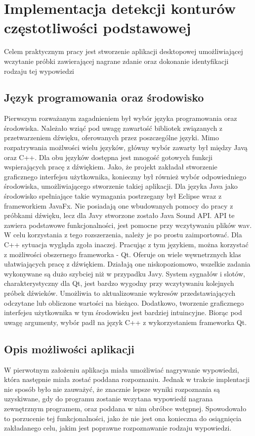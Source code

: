 \documentclass[a4paper,12 pt]{article}
\begin{document}
\section{Implementacja detekcji konturów częstotliwości podstawowej}
Celem praktycznym pracy jest stworzenie aplikacji desktopowej umożliwiającej wczytanie próbki zawierającej nagrane zdanie oraz dokonanie identyfikacji rodzaju tej wypowiedzi

\subsection{Język programowania oraz środowisko}
Pierwszym rozważanym zagadnieniem był wybór języka programowania oraz środowiska. Należało wziąć pod uwagę zawartość bibliotek związanych z przetwarzeniem dźwięku, oferowanych przez poszczególne języki.
Mimo rozpatrywania możlwości wielu języków, główny wybór zawarty był między Javą oraz C++. Dla obu języków dostępna jest mnogość gotowych funkcji wspierających pracę z dźwiękiem. Jako, że projekt zakładał stworzenie graficznego interfejsu użytkownika, 
konieczny był również wybór odpowiedniego środowiska, umożliwiającego stworzenie takiej aplikacji. Dla języka Java jako środowisko spełniające takie wymagania postrzegany był Eclipse wraz z frameworkiem JavaFx. Nie posiadają one wbudowanych pomocy do pracy z próbkami dźwięku, lecz dla Javy stworzone zostało
Java Sound API. API te zawiera podstawowe funkcjonalności, jest pomocne przy wczytywaniu plików wav. W celu korzystania z tego rozszerzenia, należy je po prostu zaimportować. Dla  C++ sytuacja wygląda zgoła inaczej. Pracując z tym językiem, można korzystać z możliwości obszernego frameworka - Qt. Oferuje on wiele węwnetrznych klas ułatwiających pracę z dźwiękiem. Działają one niskopoziomowo, wszelkie zadania wykonywane są dużo szybciej niż w przypadku Javy.  System sygnałów i slotów, charakterystyczny dla Qt, jest bardzo wygodny przy wczytywaniu kolejnych próbek dźwieków. Umożliwia to aktualizowanie wykresów przedstawiających odczytane lub obliczone wartości na bieżąco. Dodatkowo, tworzenie graficznego interfejsu użytkownika w tym środowisku jest bardziej intuincyjne. Biorąc pod uwagę argumenty, wybór padł na język C++ z wykorzystaniem frameworka Qt.

\subsection{Opis możliwości aplikacji}
W pierwotnym założeniu aplikacja miała umożliwiać nagrywanie wypowiedzi, która następnie miała zostać poddana rozpoznaniu. Jednak w trakcie implentacji nie sposób było nie zauważyć, że znacznie lepsze wyniki rozpoznania są uzyskiwane, gdy do programu zostanie wczytana wypowiedź nagrana zewnętrznym programem, oraz poddana w nim obróbce wstępnej. Spowodowało to porzucenie tej funkcjonalności, jako że nie jest ona konieczna do osiągnięcia zakładanego celu, jakim jest poprawne rozpoznawanie rodzaju wypowiedzi.
\end{document}
